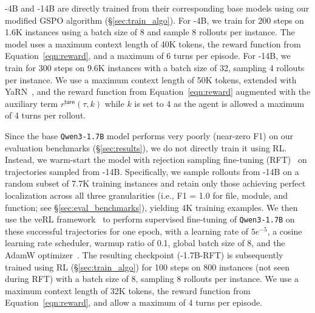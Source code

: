 \methodname-4B and \methodname-14B are directly trained from their corresponding base models using our modified GSPO algorithm (\S\ref{sec:train_algo}). For \methodname-4B, we train for 200 steps on 1.6K instances using a batch size of 8 and sample 8 rollouts per instance. The model uses a maximum context length of 40K tokens, the reward function from Equation~\ref{eqn:reward}, and a maximum of 6 turns per episode. For \methodname-14B, we train for 300 steps on 9.6K instances with a batch size of 32, sampling 4 rollouts per instance. We use a maximum context length of 50K tokens, extended with YaRN~\citep{peng2026yarnefficientcontextwindow}, and the reward function from Equation~\ref{eqn:reward} augmented with the auxiliary term $r^{\mathsf{turn}}(\tau, k)$ while $k$ is set to 4 as the agent is allowed a maximum of 4 turns per rollout.

Since the base \texttt{Qwen3-1.7B} model performs very poorly (near-zero F1) on our evaluation benchmarks (\S\ref{sec:results}), we do not directly train it using RL. Instead, we warm-start the model with rejection sampling fine-tuning (RFT)~\citep{yuan2023scalingrelationshiplearningmathematical} on trajectories sampled from \methodname-14B. Specifically, we sample rollouts from \methodname-14B on a random subset of 7.7K training instances and retain only those achieving perfect localization across all three granularities (i.e., F1 = 1.0 for file, module, and function; see \S\ref{sec:eval_benchmarks}), yielding 4K training examples. We then use the veRL framework~\citep{Sheng_2025} to perform supervised fine-tuning of \texttt{Qwen3-1.7B} on these successful trajectories for one epoch, with a learning rate of $5e^{-5}$, a cosine learning rate scheduler, warmup ratio of 0.1, global batch size of 8, and the AdamW optimizer~\citep{loshchilov2019decoupledweightdecayregularization}. The resulting checkpoint (\methodname-1.7B-RFT) is subsequently trained using RL (\S\ref{sec:train_algo}) for 100 steps on 800 instances (not seen during RFT) with a batch size of 8, sampling 8 rollouts per instance. We use a maximum context length of 32K tokens, the reward function from Equation~\ref{eqn:reward}, and allow a maximum of 4 turns per episode.

